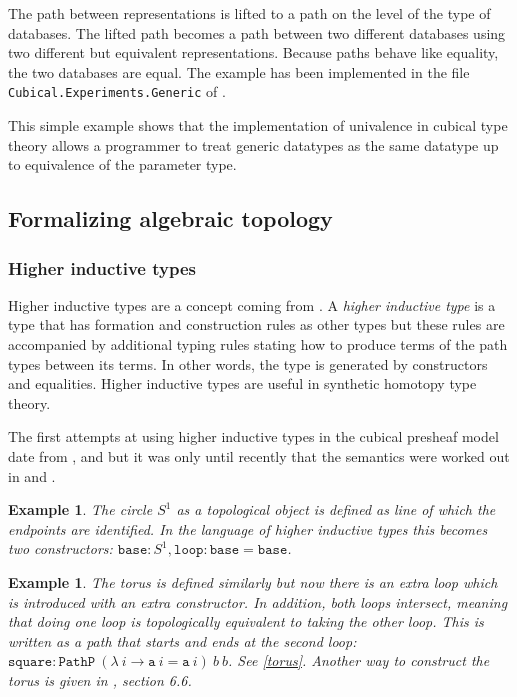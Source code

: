 \documentclass[12pt,a4paper,twoside,xetex]{book} %
\newcommand{\keyword}[1]{\emph{#1}\index{#1}}
\newtheorem{example}[theorem]{Example}
\newcommand{\op}[1]{\mathtt{#1}}
\begin{document}
The path between representations is lifted to a path on the level of the type 
of databases. The lifted path becomes a path between two different databases 
using two different but equivalent representations. Because paths behave like 
equality, the two databases are equal. The example has been implemented in the 
file \texttt{Cubical.Experiments.Generic} of \cite{Moertberg2018}.

This simple example shows that the implementation of univalence in cubical type 
theory allows a programmer to treat generic datatypes as the same datatype up 
to equivalence of the parameter type.

\subsection{Formalizing algebraic topology}

\subsubsection{Higher inductive types}\label{hit}

Higher inductive types are a concept coming from \cite{Voevodsky2013}. A 
\keyword{higher inductive type} is a type that has formation and construction 
rules  as other types but these rules are accompanied by additional typing 
rules stating how to produce terms of the path types between its terms. In 
other words, the type is generated by constructors and equalities. Higher 
inductive types are useful in synthetic homotopy type theory.

The first attempts at using higher inductive types in the cubical presheaf 
model date from \cite{Licata2015}, \cite{Huber2016} and \cite{Cohen2016} but it 
was only until recently that the semantics were worked out in \cite 
{Lumsdaine2017} and  \cite{Coquand2018}.



\begin{example}
The \keyword{circle} $S^1$ as a topological object is defined as line of which 
the endpoints are identified. In the language of higher inductive types this 
becomes two constructors: $\op{base} : S^1,  \op{loop} : \op{base} = \op{base}$.
\end{example}

\begin{example}
The \keyword{torus} is defined similarly but now there is an extra loop which is 
introduced with an extra constructor. In addition, both loops intersect, 
meaning that doing one loop is topologically equivalent to taking the other 
loop. This is written as a path that starts and ends at the second loop: 
$\op{square} : \op{PathP} \ (\lambda \ i \rightarrow \op{a} \ i = \op{a} \ i) \ 
b  \ b$. See \cref{torus}. Another way to construct the torus is given in 
\cite{Voevodsky2013}, section 6.6.
\end{example}
\end{document}
